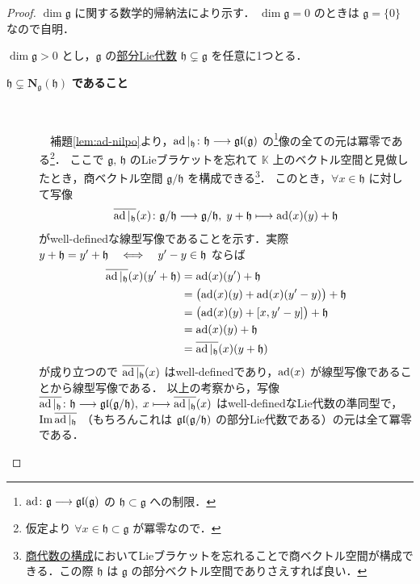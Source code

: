 \documentclass[rep_main]{subfiles}
\begin{document}
\begin{proof}
    $\dim \mathfrak{g}$ に関する数学的帰納法により示す．
    $\dim \mathfrak{g} = 0$ のときは $\mathfrak{g} = \{0\}$ なので自明．

    $\dim \mathfrak{g} > 0$ とし，$\mathfrak{g}$ の\hyperref[def:subLieAlg]{部分Lie代数} $\mathfrak{h} \subsetneq \mathfrak{g}$ を任意に1つとる．
    
    \begin{description}
        \item[$\bm{\mathfrak{h} \subsetneq N_{\mathfrak{g}} (\mathfrak{h})}$ \textbf{であること}]　
        
            　補題\ref{lem:ad-nilpo}より，$\operatorname{ad}|_{\mathfrak{h}} \colon \mathfrak{h} \longrightarrow \mathfrak{gl}(\mathfrak{g})$ の\footnote{$\operatorname{ad} \colon \mathfrak{g} \longrightarrow \mathfrak{gl} (\mathfrak{g})$ の $\mathfrak{h} \subset \mathfrak{g}$ への制限．}像の全ての元は冪零である\footnote{仮定より $\forall x \in \mathfrak{h} \subset \mathfrak{g}$ が冪零なので．}．
            ここで $\mathfrak{g},\, \mathfrak{h}$ のLieブラケットを忘れて $\mathbb{K}$ 上のベクトル空間と見做したとき，商ベクトル空間 $\mathfrak{g} / \mathfrak{h}$ を構成できる\footnote{\hyperref[def:quotient-LieAlg]{商代数の構成}においてLieブラケットを忘れることで商ベクトル空間が構成できる．この際 $\mathfrak{h}$ は $\mathfrak{g}$ の部分ベクトル空間でありさえすれば良い．}．
            このとき，$\forall x \in \mathfrak{h}$ に対して写像
            \begin{align}
                \overline{\operatorname{ad}|_{\mathfrak{h}}}(x) \colon \mathfrak{g} / \mathfrak{h} \longrightarrow \mathfrak{g} / \mathfrak{h},\; y + \mathfrak{h} \longmapsto \operatorname{ad} (x) (y) + \mathfrak{h}
            \end{align}
            がwell-definedな線型写像であることを示す．実際 $y + \mathfrak{h} = y' + \mathfrak{h} \quad \Longleftrightarrow \quad y' - y \in \mathfrak{h}$ ならば
            \begin{align}
                \overline{\ad|_{\mathfrak{h}}}(x) (y' + \mathfrak{h}) &= \ad (x) (y')  + \mathfrak{h} \\
                &= \bigl(\ad (x) (y) + \ad (x) (y' - y)\bigr) + \mathfrak{h} \\
                &= \bigl(\ad (x) (y) + \comm{x}{y' - y}\bigr) + \mathfrak{h} \\
                &= \ad (x) (y) + \mathfrak{h} \\
                &= \overline{\ad|_{\mathfrak{h}}}(x) (y + \mathfrak{h})
            \end{align}
            が成り立つので $\overline{\operatorname{ad}|_{\mathfrak{h}}}(x)$ はwell-definedであり，$\operatorname{ad} (x)$ が線型写像であることから線型写像である．
            以上の考察から，写像 $\overline{\operatorname{ad}|_{\mathfrak{h}}} \colon \mathfrak{h} \longrightarrow \mathfrak{gl} (\mathfrak{g} / \mathfrak{h}),\; x \longmapsto \overline{\operatorname{ad}|_{\mathfrak{h}}} (x)$ はwell-definedなLie代数の準同型で，$\Im \overline{\operatorname{ad}|_{\mathfrak{h}}}$ （もちろんこれは $\mathfrak{gl} (\mathfrak{g}/\mathfrak{h})$ の部分Lie代数である）の元は全て冪零である．


\end{description}
\end{proof}
\end{document}
